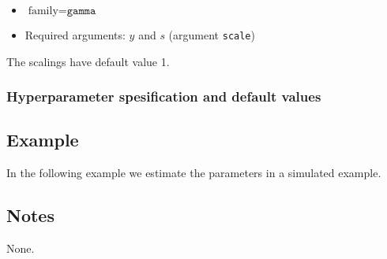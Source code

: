 \documentclass[a4paper,11pt]{article}
\begin{document}
\begin{itemize}
\item $\text{family}=\texttt{gamma}$
\item Required arguments: $y$ and $s$ (argument \texttt{scale})
\end{itemize}
The scalings have default value 1.

\subsubsection*{Hyperparameter spesification and default values}



\subsection*{Example}

In the following example we estimate the parameters in a simulated
example.


\subsection*{Notes}

None.
\end{document}
